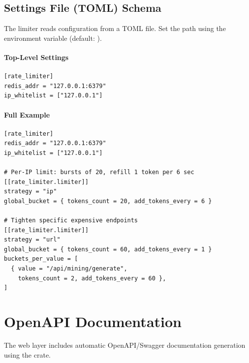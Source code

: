 \subsection{Settings File (TOML) Schema}

The limiter reads configuration from a TOML file. Set the path using the  environment variable (default: ).

\paragraph{Top-Level Settings}

\begin{listing}[H]
\caption{Rate limiter TOML configuration}
\label{lst:ratelimit-toml}
\begin{verbatim}
[rate_limiter]
redis_addr = "127.0.0.1:6379"
ip_whitelist = ["127.0.0.1"]
\end{verbatim}
\end{listing}

\paragraph{Full Example}

\begin{listing}[H]
\caption{Complete rate limiter configuration}
\label{lst:ratelimit-full-config}
\begin{verbatim}
[rate_limiter]
redis_addr = "127.0.0.1:6379"
ip_whitelist = ["127.0.0.1"]

# Per-IP limit: bursts of 20, refill 1 token per 6 sec
[[rate_limiter.limiter]]
strategy = "ip"
global_bucket = { tokens_count = 20, add_tokens_every = 6 }

# Tighten specific expensive endpoints
[[rate_limiter.limiter]]
strategy = "url"
global_bucket = { tokens_count = 60, add_tokens_every = 1 }
buckets_per_value = [
  { value = "/api/mining/generate",
    tokens_count = 2, add_tokens_every = 60 },
]
\end{verbatim}
\end{listing}

\section{OpenAPI Documentation}
\label{sec:openapi}

The web layer includes automatic OpenAPI/Swagger documentation generation using the  crate.

